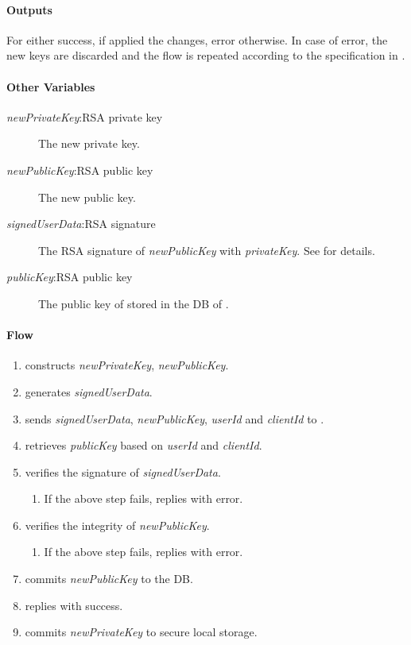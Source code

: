 \documentclass[a4paper,10pt,draft]{article}
\newcommand{\signedUserData}{\emph{signedUserData}}
\newcommand{\newPublicKey}{\emph{newPublicKey}}
\newcommand{\newPrivateKey}{\emph{newPrivateKey}}
\newcommand{\privateKey}{\emph{privateKey}}
\newcommand{\publicKey}{\emph{publicKey}}
\newcommand{\userId}{\emph{userId}}
\newcommand{\clientId}{\emph{clientId}}
\begin{document}
\paragraph{Outputs}
For \Client{} either success, if \Server{} applied the changes, error 
otherwise. In case of error, the new keys are discarded and the flow is 
repeated according to the specification in \cite{crypto_spec}.

\paragraph{Other Variables}
\SpecialItem
\begin{description}
 \item[\newPrivateKey{}:RSA private key] The new private key.
 \item[\newPublicKey{}:RSA public key] The new public key.
 \item[\signedUserData{}:RSA signature] The RSA signature of \newPublicKey{} 
with \privateKey{}. See \cite{crypto_spec} for details.
 \item[\publicKey{}:RSA public key] The public key of \Client{} stored in the 
DB of \Server{}.
\end{description}

\paragraph{Flow}

\begin{enumerate}
 \item \Client{} constructs \newPrivateKey{}, \newPublicKey{}.
 \item \Client{} generates \signedUserData{}.
 \item \Client{} sends \signedUserData{}, \newPublicKey{}, \userId{} and
\clientId{} to \Server{}.
 \item \Server{} retrieves \publicKey{} based on \userId{} and \clientId{}.
 \item \Server{} verifies the signature of \signedUserData{}.
 \begin{enumerate}
  \item If the above step fails, \Server{} replies with error.
 \end{enumerate}
 \item \Server{} verifies the integrity of \newPublicKey{}.
 \begin{enumerate}
  \item If the above step fails, \Server{} replies with error.
 \end{enumerate}
 \item \Server{} commits \newPublicKey{} to the DB.
 \item \Server{} replies with success.
 \item\label{modify_public_key:local_storage} \Client{} commits 
\newPrivateKey{} to secure local storage.
\end{enumerate}
\end{document}
